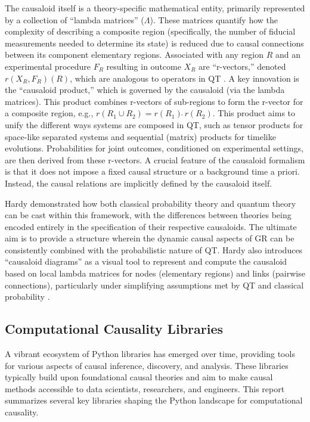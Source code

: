 {The causaloid itself is a theory-specific mathematical entity, primarily represented by a collection of ``lambda matrices'' (\(\Lambda\)). These matrices quantify how the complexity of describing a composite region (specifically, the number of fiducial measurements needed to determine its state) is reduced due to causal connections between its component elementary regions. Associated with any region $R$ and an experimental procedure $F_R$ resulting in outcome $X_R$ are ``r-vectors,'' denoted $r(X_R, F_R)(R)$, which are analogous to operators in QT \cite{hardy2005probability}. A key innovation is the ``causaloid product,'' which is governed by the causaloid (via the lambda matrices). This product combines r-vectors of sub-regions to form the r-vector for a composite region, e.g., $r(R_1 \cup R_2) = r(R_1) \hat{\;} r(R_2)$. This product aims to unify the different ways systems are composed in QT, such as tensor products for space-like separated systems and sequential (matrix) products for timelike evolutions. Probabilities for joint outcomes, conditioned on experimental settings, are then derived from these r-vectors. A crucial feature of the causaloid formalism is that it does not impose a fixed causal structure or a background time a priori. Instead, the causal relations are implicitly defined by the causaloid itself.

Hardy demonstrated how both classical probability theory and quantum theory can be cast within this framework, with the differences between theories being encoded entirely in the specification of their respective causaloids. The ultimate aim is to provide a structure wherein the dynamic causal aspects of GR can be consistently combined with the probabilistic nature of QT. Hardy also introduces ``causaloid diagrams'' as a visual tool to represent and compute the causaloid based on local lambda matrices for nodes (elementary regions) and links (pairwise connections), particularly under simplifying assumptions met by QT and classical probability \cite{hardy2005probability}.

\newpage

\subsection{Computational Causality Libraries}

A vibrant ecosystem of Python libraries has emerged over time, providing tools for various aspects of causal inference, discovery, and analysis. These libraries typically build upon foundational causal theories and aim to make causal methods accessible to data scientists, researchers, and engineers. This report summarizes several key libraries shaping the Python landscape for computational causality.

}
